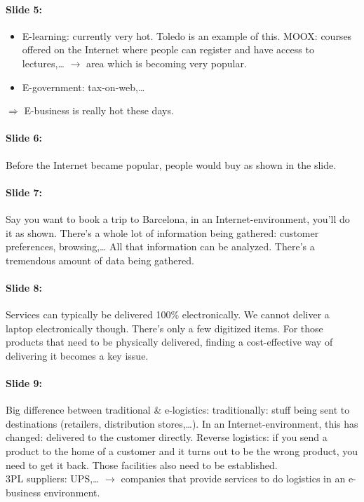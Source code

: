 \documentclass[10pt,a4paper]{report}
\begin{document}
\paragraph{Slide 5: }
\begin{itemize}
\item E-learning: currently very hot. Toledo is an example of this. MOOX: courses offered on the Internet where people can register and have access to lectures,… $\rightarrow$ area which is becoming very popular.
\item E-government: tax-on-web,\ldots
\end{itemize}
$\Rightarrow$ E-business is really hot these days.

\paragraph{Slide 6:}Before the Internet became popular, people would buy as shown in the slide.

\paragraph{Slide 7:}Say you want to book a trip to Barcelona, in an Internet-environment, you'll do it as shown. There's a whole lot of information being gathered: customer preferences, browsing,… All that information can be analyzed. There's a tremendous amount of data being gathered.

\paragraph{Slide 8:}Services can typically be delivered 100\% electronically. We cannot deliver a laptop electronically though. There's only a few digitized items. For those products that need to be physically delivered, finding a cost-effective way of delivering it becomes a key issue.

\paragraph{Slide 9:}Big difference between traditional \& e-logistics: traditionally: stuff being sent to destinations (retailers, distribution stores,…). In an Internet-environment, this has changed: delivered to the customer directly.
Reverse logistics: if you send a product to the home of a customer and it turns out to be the wrong product, you need to get it back. Those facilities also need to be established.\\
3PL suppliers: UPS,… $\rightarrow$ companies that provide services to do logistics in an e-business environment.
\end{document}
